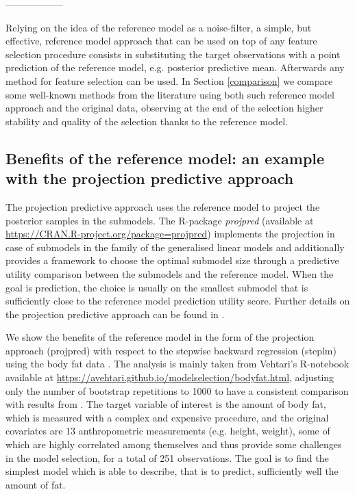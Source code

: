 \documentclass[american,]{article}
\theoremstyle{definition}
\begin{document}
------------------

Relying on the idea of the reference model as a noise-filter, a simple, but effective, reference model approach that can be used on top of any feature selection procedure consists in substituting the target observations with a point prediction of the reference model, e.g. posterior predictive mean. Afterwards any method for feature selection can be used. In Section \ref{comparison} we compare some well-known methods from the literature using both such reference model approach and the original data, observing at the end of the selection higher stability and quality of the selection thanks to the reference model.

\hypertarget{projection}{%
\subsection{Benefits of the reference model: an example with the projection predictive approach}\label{projection}}

The projection predictive approach uses the reference model to project the posterior samples in the submodels. The R-package \textit{projpred} (available at \url{https://CRAN.R-project.org/package=projpred}) implements the projection in case of submodels in the family of the generalised linear models and additionally provides a framework to choose the optimal submodel size through a predictive utility comparison between the submodels and the reference model. When the goal is prediction, the choice is usually on the smallest submodel that is sufficiently close to the reference model prediction utility score. Further details on the projection predictive approach can be found in \cite{paper:projpred}.

We show the benefits of the reference model in the form of the projection approach (projpred) with respect to the stepwise backward regression (steplm) using the body fat data \citep{paper:bodyfat_johnson}. The analysis is mainly taken from Vehtari's R-notebook available at \url{https://avehtari.github.io/modelselection/bodyfat.html}, adjusting only the number of bootstrap repetitions to 1000 to have a consistent comparison with results from \cite{paper:bodyfat}. The target variable of interest is the amount of body fat, which is measured with a complex and expensive procedure, and the original covariates are 13 anthropometric measurements (e.g. height, weight), some of which are highly correlated among themselves and thus provide some challenges in the model selection, for a total of 251 observations. The goal is to find the simplest model which is able to describe, that is to predict, sufficiently well the amount of fat. 
\end{document}
